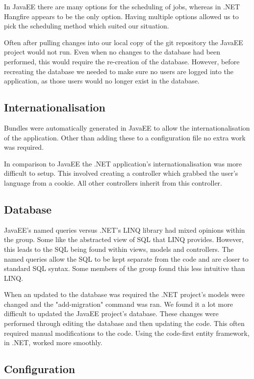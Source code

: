In JavaEE there are many options for the scheduling of jobs, whereas in .NET Hangfire appears to be the only option. Having multiple options allowed us to pick the scheduling method which suited our situation.

Often after pulling changes into our local copy of the git repository the JavaEE project would not run. Even when no changes to the database had been performed, this would require the re-creation of the database. However, before recreating the database we needed to make sure no users are logged into the application, as those users would no longer exist in the database.

\subsection{Internationalisation}

Bundles were automatically generated in JavaEE to allow the internationalisation of the application. Other than adding these to a configuration file no extra work was required. 

In comparison to JavaEE the .NET application's internationalisation was more difficult to setup. This involved creating a controller which grabbed the user's language from a cookie. All other controllers inherit from this controller.

\subsection{Database}

JavaEE's named queries versus .NET's LINQ library had mixed opinions within the group. Some like the abstracted view of SQL that LINQ provides. However, this leads to the SQL being found within views, models and controllers. The named queries allow the SQL to be kept separate from the code and are closer to standard SQL syntax. Some members of the group found this less intuitive than LINQ.

When an updated to the database was required the .NET project's models were changed and the "add-migration" command was ran. We found it a lot more difficult to updated the JavaEE project's database. These changes were performed through editing the database and then updating the code. This often required manual modifications to the code. Using the code-first entity framework, in .NET, worked more smoothly. 

\subsection{Configuration}

